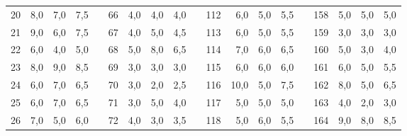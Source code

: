 \begin{table}[H]
{\begin{tabular}{|r|r|r|r|l|r|r|r|r|l|r|r|r|r|lrrrr}
20                               & 8,0                          & 7,0                          & 7,5                          &  & 66 & 4,0  & 4,0  & 4,0  &  & 112 & 6,0  & 5,0  & 5,5  & \multicolumn{1}{l|}{} & \multicolumn{1}{r|}{158} & \multicolumn{1}{r|}{5,0}  & \multicolumn{1}{r|}{5,0}  & \multicolumn{1}{r|}{5,0}  \\ \cline{1-4} \cline{6-9} \cline{11-14} \cline{16-19} 
21                               & 9,0                          & 6,0                          & 7,5                          &  & 67 & 4,0  & 5,0  & 4,5  &  & 113 & 6,0  & 5,0  & 5,5  & \multicolumn{1}{l|}{} & \multicolumn{1}{r|}{159} & \multicolumn{1}{r|}{3,0}  & \multicolumn{1}{r|}{3,0}  & \multicolumn{1}{r|}{3,0}  \\ \cline{1-4} \cline{6-9} \cline{11-14} \cline{16-19} 
22                               & 6,0                          & 4,0                          & 5,0                          &  & 68 & 5,0  & 8,0  & 6,5  &  & 114 & 7,0  & 6,0  & 6,5  & \multicolumn{1}{l|}{} & \multicolumn{1}{r|}{160} & \multicolumn{1}{r|}{5,0}  & \multicolumn{1}{r|}{3,0}  & \multicolumn{1}{r|}{4,0}  \\ \cline{1-4} \cline{6-9} \cline{11-14} \cline{16-19} 
23                               & 8,0                          & 9,0                          & 8,5                          &  & 69 & 3,0  & 3,0  & 3,0  &  & 115 & 6,0  & 6,0  & 6,0  & \multicolumn{1}{l|}{} & \multicolumn{1}{r|}{161} & \multicolumn{1}{r|}{6,0}  & \multicolumn{1}{r|}{5,0}  & \multicolumn{1}{r|}{5,5}  \\ \cline{1-4} \cline{6-9} \cline{11-14} \cline{16-19} 
24                               & 6,0                          & 7,0                          & 6,5                          &  & 70 & 3,0  & 2,0  & 2,5  &  & 116 & 10,0 & 5,0  & 7,5  & \multicolumn{1}{l|}{} & \multicolumn{1}{r|}{162} & \multicolumn{1}{r|}{8,0}  & \multicolumn{1}{r|}{5,0}  & \multicolumn{1}{r|}{6,5}  \\ \cline{1-4} \cline{6-9} \cline{11-14} \cline{16-19} 
25                               & 6,0                          & 7,0                          & 6,5                          &  & 71 & 3,0  & 5,0  & 4,0  &  & 117 & 5,0  & 5,0  & 5,0  & \multicolumn{1}{l|}{} & \multicolumn{1}{r|}{163} & \multicolumn{1}{r|}{4,0}  & \multicolumn{1}{r|}{2,0}  & \multicolumn{1}{r|}{3,0}  \\ \cline{1-4} \cline{6-9} \cline{11-14} \cline{16-19} 
26                               & 7,0                          & 5,0                          & 6,0                          &  & 72 & 4,0  & 3,0  & 3,5  &  & 118 & 5,0  & 6,0  & 5,5  & \multicolumn{1}{l|}{} & \multicolumn{1}{r|}{164} & \multicolumn{1}{r|}{9,0}  & \multicolumn{1}{r|}{8,0}  & \multicolumn{1}{r|}{8,5}  \\ \cline{1-4} \cline{6-9} \cline{11-14} \cline{16-19} 

\end{tabular}}
\end{table}

